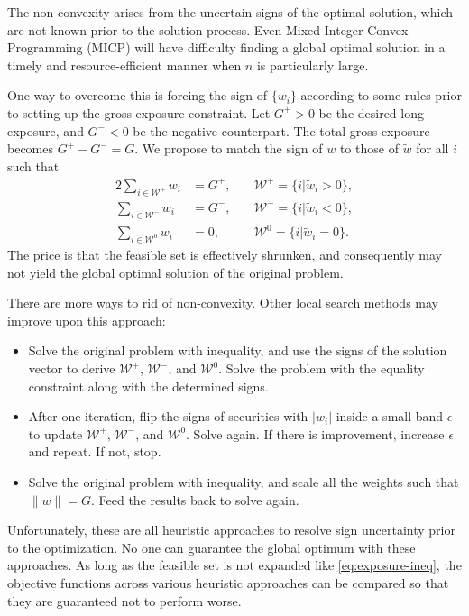 \documentclass[11pt, letterpaper]{article}
\begin{document}
The non-convexity arises from the uncertain signs of the optimal solution, which are not known prior to the solution
process. Even Mixed-Integer Convex Programming (MICP) will have difficulty finding a global optimal solution in a timely and
resource-efficient manner when $n$ is particularly large.

One way to overcome this is forcing the sign of $\{w_i\}$ according to some rules prior to setting up the gross exposure
constraint. Let $G^+ > 0$ be the desired long exposure, and $G^- < 0$ be the negative counterpart. The total gross exposure
becomes $G^+ - G^- = G$. We propose to match the sign of $w$ to those of $\tilde{w}$ for all $i$ such that
\begin{alignat*}{2}
	\sum_{i\in\mathcal{W}^+} {w_i} &= G^+,\quad & \mathcal{W}^+=\{i|\tilde{w}_i > 0\},\\
	\sum_{i\in\mathcal{W}^-} {w_i} &= G^-,\quad & \mathcal{W}^-=\{i|\tilde{w}_i < 0\},\\
	\sum_{i\in\mathcal{W}^0} {w_i} &= 0, & \mathcal{W}^0=\{i|\tilde{w}_i = 0\}.
\end{alignat*}
The price is that the feasible set is effectively shrunken, and consequently may not yield the global optimal solution of the
original problem.

There are more ways to rid of non-convexity. Other local search methods may improve upon this approach:
\begin{itemize}
\item Solve the original problem with inequality, and use the signs of the solution vector to derive $\mathcal{W}^+$,
	$\mathcal{W}^-$, and $\mathcal{W}^0$. Solve the problem with the equality constraint along with the determined signs.
\item After one iteration, flip the signs of securities with $|w_i|$ inside a small band $\epsilon$ to update $\mathcal{W}^+$,
  $\mathcal{W}^-$, and $\mathcal{W}^0$. Solve again. If there is improvement, increase $\epsilon$ and repeat.  If not, stop.
\item Solve the original problem with inequality, and scale all the weights such that $\lVert w\rVert = G$.  Feed the results
  back to solve again.
\end{itemize}
Unfortunately, these are all heuristic approaches to resolve sign uncertainty prior to the optimization. No one can guarantee
the global optimum with these approaches. As long as the feasible set is not expanded like \eqref{eq:exposure-ineq}, the
objective functions across various heuristic approaches can be compared so that they are guaranteed not to perform worse.
\end{document}
